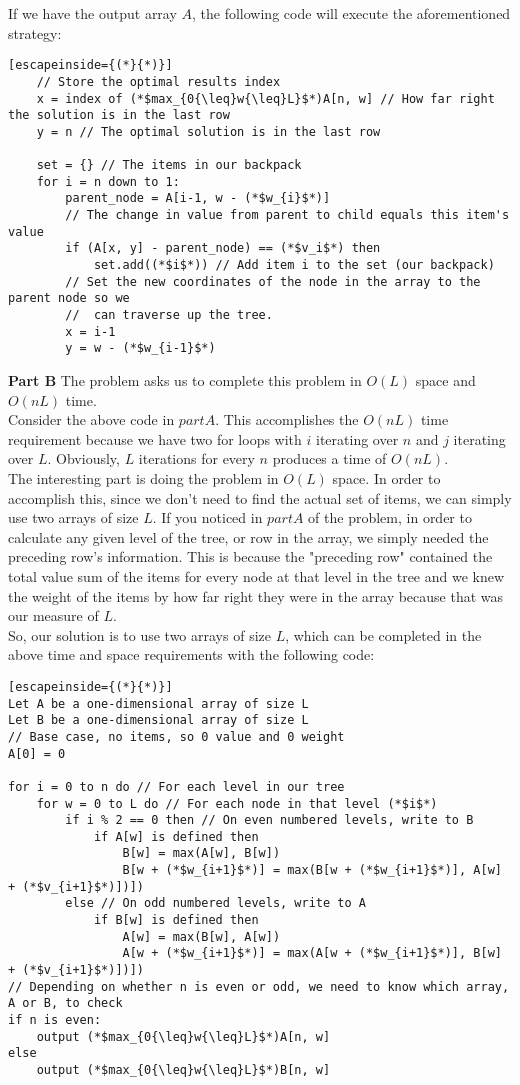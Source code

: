 \documentclass{article}
\begin{document}
	If we have the output array $A$, the following code will execute the aforementioned strategy:

	\begin{lstlisting}[escapeinside={(*}{*)}]
	// Store the optimal results index
	x = index of (*$max_{0{\leq}w{\leq}L}$*)A[n, w] // How far right the solution is in the last row
	y = n // The optimal solution is in the last row

	set = {} // The items in our backpack
	for i = n down to 1:
		parent_node = A[i-1, w - (*$w_{i}$*)]
		// The change in value from parent to child equals this item's value
		if (A[x, y] - parent_node) == (*$v_i$*) then
			set.add((*$i$*)) // Add item i to the set (our backpack)
		// Set the new coordinates of the node in the array to the parent node so we
		// 	can traverse up the tree.
		x = i-1
		y = w - (*$w_{i-1}$*)
	\end{lstlisting}

	\textbf{Part B} The problem asks us to complete this problem in $O(L)$ space and $O(nL)$ time.\\

	Consider the above code in $part A$.  This accomplishes the $O(nL)$ time requirement because we have two for loops with $i$ iterating over $n$ and $j$ iterating over $L$.  Obviously, $L$ iterations for every $n$ produces a time of $O(nL)$.  \\

	The interesting part is doing the problem in $O(L)$ space.  In order to accomplish this, since we don't need to find the actual set of items, we can simply use two arrays of size $L$.  If you noticed in $part A$ of the problem, in order to calculate any given level of the tree, or row in the array, we simply needed the preceding row's information.  This is because the "preceding row" contained the total value sum of the items for every node at that level in the tree and we knew the weight of the items by how far right they were in the array because that was our measure of $L$.\\

	So, our solution is to use two arrays of size $L$, which can be completed in the above time and space requirements with the following code:
	\begin{lstlisting}[escapeinside={(*}{*)}]
Let A be a one-dimensional array of size L
Let B be a one-dimensional array of size L
// Base case, no items, so 0 value and 0 weight
A[0] = 0

for i = 0 to n do // For each level in our tree
	for w = 0 to L do // For each node in that level (*$i$*)
		if i % 2 == 0 then // On even numbered levels, write to B
			if A[w] is defined then
				B[w] = max(A[w], B[w])
				B[w + (*$w_{i+1}$*)] = max(B[w + (*$w_{i+1}$*)], A[w] + (*$v_{i+1}$*)])])
		else // On odd numbered levels, write to A
			if B[w] is defined then
				A[w] = max(B[w], A[w])
				A[w + (*$w_{i+1}$*)] = max(A[w + (*$w_{i+1}$*)], B[w] + (*$v_{i+1}$*)])])
// Depending on whether n is even or odd, we need to know which array, A or B, to check
if n is even:
	output (*$max_{0{\leq}w{\leq}L}$*)A[n, w]
else
	output (*$max_{0{\leq}w{\leq}L}$*)B[n, w]
	\end{lstlisting}
\end{document}
